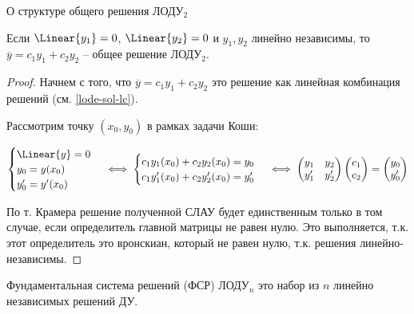 
\begin{theorem}\label{lode-gen}
  О структуре общего решения ЛОДУ\(_2\)

  Если \(\Linear{y_{1}} = 0\), \(\Linear{y_{2}} = 0\) и \(y_{1}, y_{2}\)
  линейно независимы, то \(\overline{y} = c_{1} y_{1} + c_{2} y_{2}\) -- общее
  решение ЛОДУ\(_2\).
\end{theorem}
\begin{proof}
  Начнем с того, что \(\overline{y} = c_{1} y_{1} + c_{2} y_{2}\) это решение
  как линейная комбинация решений (см. \ref{lode-sol-lc}).

  Рассмотрим точку \((x_{0}, y_{0})\) в рамках задачи Коши:

  \begin{align*}
    \begin{cases}
      \Linear{y} = 0 \\
      y_{0} = y(x_{0}) \\
      y'_{0} = y'(x_{0})
    \end{cases} \iff
    \begin{cases}
      c_{1} y_{1}(x_{0}) + c_{2} y_{2}(x_{0}) = y_{0} \\
      c_{1} y'_{1}(x_{0}) + c_{2} y'_{2}(x_{0}) = y'_{0}
    \end{cases} \iff
    \begin{pmatrix}
      y_{1} & y_{2} \\
      y'_{1} & y'_{2}
    \end{pmatrix}
    \begin{pmatrix}
      c_{1} \\
      c_{2}
    \end{pmatrix}
    =
    \begin{pmatrix}
      y_{0} \\
      y'_{0}
    \end{pmatrix}
  \end{align*}

  По т. Крамера решение полученной СЛАУ будет единственным только в том случае,
  если определитель главной матрицы не равен нулю. Это выполняется, т.к.
  этот определитель это вронскиан, который не равен нулю, т.к. решения
  линейно-независимы.
\end{proof}

\begin{definition}
  Фундаментальная система решений (ФСР) ЛОДУ\(_n\) это набор из \(n\) линейно
  независимых решений ДУ.
\end{definition}
